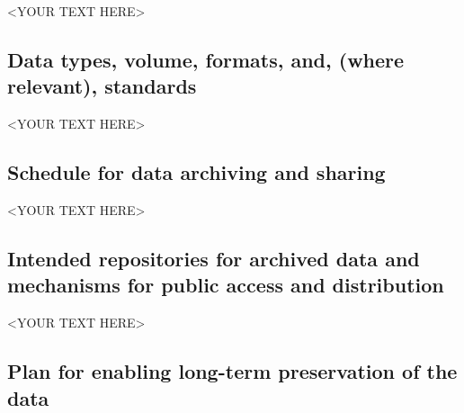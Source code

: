 <YOUR TEXT HERE>


\subsection{Data types, volume, formats, and, (where relevant), standards}

<YOUR TEXT HERE>


\subsection{Schedule for data archiving and sharing}

<YOUR TEXT HERE>


\subsection{Intended repositories for archived data and mechanisms for public access and distribution}

<YOUR TEXT HERE>


\subsection{Plan for enabling long-term preservation of the data}

